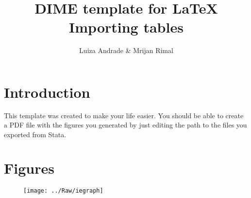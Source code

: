 \documentclass{article}                 %
\title{DIME template for \LaTeX \\ Importing tables} 	%
\author{Luiza Andrade \& Mrijan Rimal}
\begin{document}

    \maketitle
    \tableofcontents        %
    \listoffigures			%

    \newpage
    \section{Introduction} %

        This template was created to make your life easier. You should be able to create a PDF file with the figures you generated by just editing the path to the files you exported from Stata.

    \section{Figures}

		\begin{figure}[H]
			\texttt{[image: ../Raw/iegraph]}
		\end{figure}
\end{document}

